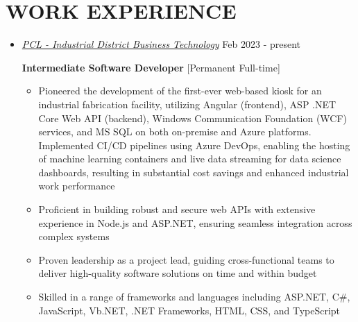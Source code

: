 \documentclass[10pt,letterpaper,roman]{moderncv} %
\begin{document}
	\section{WORK EXPERIENCE}
	\begin{itemize}
		\item \href{http://pcl.com/}{ \emph{\large PCL - Industrial District Business Technology}} \hfill Feb 2023 - present
		\vspace{0.25cm}
		
		\textbf{Intermediate Software Developer} [Permanent Full-time]
		
		\begin{itemize}
			\item Pioneered the development of the first-ever web-based kiosk for an industrial fabrication facility, utilizing Angular (frontend), ASP .NET Core Web API (backend), Windows Communication Foundation (WCF) services, and MS SQL on both on-premise and Azure platforms. Implemented CI/CD pipelines using Azure DevOps, enabling the hosting of machine learning containers and live data streaming for data science dashboards, resulting in substantial cost savings and enhanced industrial work performance
			
			\item Proficient in building robust and secure web APIs with extensive experience in Node.js and ASP.NET, ensuring seamless integration across complex systems
			
			\item Proven leadership as a project lead, guiding cross-functional teams to deliver high-quality software solutions on time and within budget
			
			\item Skilled in a range of frameworks and languages including ASP.NET, C\#, JavaScript, Vb.NET, .NET Frameworks, HTML, CSS, and TypeScript

		\end{itemize}
	\end{itemize}
	
\end{document}
